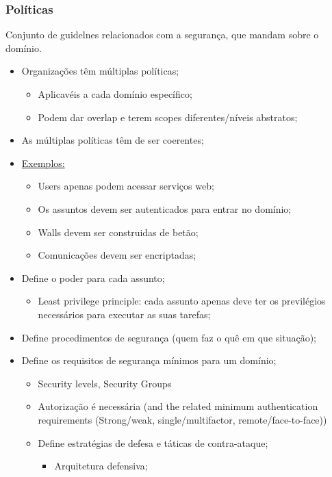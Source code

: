\documentclass{article}
\begin{document}
\pagebreak

\subsubsection{Políticas}

Conjunto de guidelnes relacionados com a segurança, que mandam sobre o domínio.

\begin{itemize}
  \item Organizações têm múltiplas políticas;
  \begin{itemize}
    \item Aplicavéis a cada domínio específico;
    \item Podem dar overlap e terem scopes diferentes/níveis abstratos;
  \end{itemize}
  \item As múltiplas políticas têm de ser coerentes;
  \item \uline{Exemplos:}
  \begin{itemize}
    \item Users apenas podem acessar serviços web;
    \item Os assuntos devem ser autenticados para entrar no domínio;
    \item Walls devem ser construidas de betão;
    \item Comunicações devem ser encriptadas;
  \end{itemize}
  \item Define o poder para cada assunto;
  \begin{itemize}
    \item Least privilege principle: cada assunto apenas deve ter os previlégios
    necessários para executar as suas tarefas;
  \end{itemize}
  \item Define procedimentos de segurança (quem faz o quê em que situação);
  \item Define os requisitos de segurança mínimos para um domínio;
  \begin{itemize}
    \item Security levels, Security Groups
    \item Autorização é necessária (and the related minimum authentication requirements (Strong/weak,
    single/multifactor, remote/face-to-face))
    \item Define estratégias de defesa e táticas de contra-ataque;
    \begin{itemize}
      \item Arquitetura defensiva;

\end{itemize}
\end{itemize}
\end{itemize}
\end{document}
